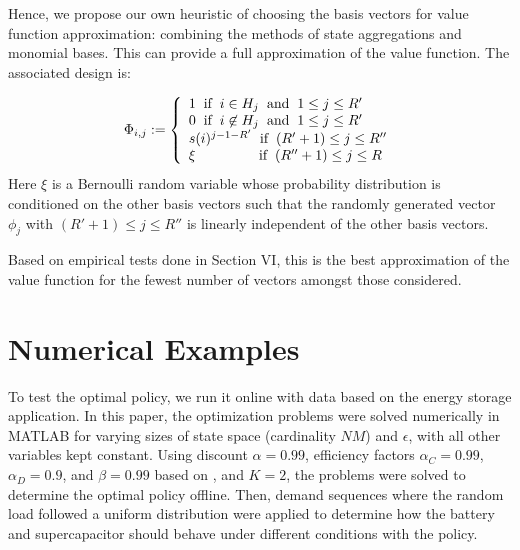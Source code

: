 \documentclass[conference]{IEEEtran}
\begin{document}
    Hence, we propose our own heuristic of choosing the basis vectors for value function approximation: combining the methods of state aggregations and monomial bases. This can provide a full approximation of the value function. The associated design is:
    
    \begin{displaymath}
        \Phi_{i,j}:=\left\{
            \begin{array}{l}
            1 \hspace{0.2cm} \text{if} \hspace{0.2cm} i\in H_{j} \hspace{0.2cm} \text{and} \hspace{0.2cm} 1\leq j\leq R'\\
            0 \hspace{0.2cm} \text{if} \hspace{0.2cm} i\not\in H_{j} \hspace{0.2cm} \text{and} \hspace{0.2cm} 1\leq j\leq R'\\
            s(i)^{j-1-R'} \hspace{0.2cm} \text{if} \hspace{0.2cm} (R'+1)\leq j\leq R''\\
            \xi \hspace{1.6cm} \text{if} \hspace{0.2cm} (R''+1)\leq j\leq R
            \end{array}
            \right.
    \end{displaymath} Here $\xi$ is a Bernoulli random variable whose probability distribution is conditioned on the other basis vectors such that the randomly generated vector $\phi_{j}$ with $(R'+1)\leq j\leq R''$ is linearly independent of the other basis vectors.
    
    Based on empirical tests done in Section VI, this is the best approximation of the value function for the fewest number of vectors amongst those considered.
    
    

\section{Numerical Examples}
To test the optimal policy, we run it online with data based on the energy storage application. In this paper, the optimization problems were solved numerically in MATLAB for varying sizes of state space (cardinality $NM$) and $\epsilon$, with all other variables kept constant. Using discount $\alpha=0.99$, efficiency factors $\alpha_{C}=0.99$, $\alpha_{D}=0.9$, and $\beta=0.99$ based on \cite{su2013modeling}, and $K=2$, the problems were solved to determine the optimal policy offline. Then, demand sequences where the random load followed a uniform distribution were applied to determine how the battery and supercapacitor should behave under different conditions with the policy.
\end{document}
